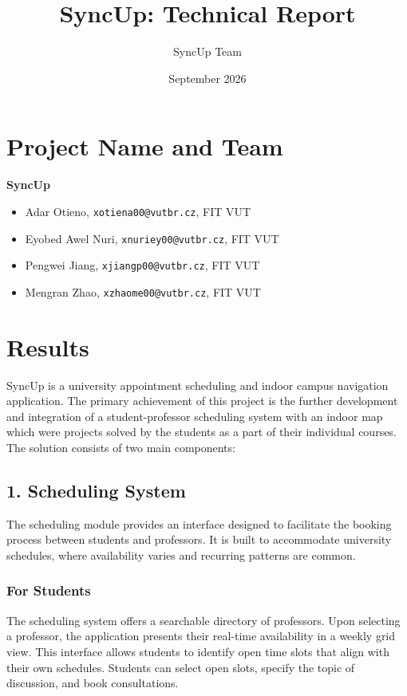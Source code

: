 \documentclass[12pt,a4paper]{article}
\title{\textbf{SyncUp: Technical Report}}
\author{SyncUp Team}
\date{September 2026}
\begin{document}
\maketitle

\section*{Project Name and Team}
\textbf{SyncUp}

\begin{itemize}
    \item Adar Otieno, \texttt{xotiena00@vutbr.cz}, FIT VUT
    \item Eyobed Awel Nuri, \texttt{xnuriey00@vutbr.cz}, FIT VUT
    \item Pengwei Jiang, \texttt{xjiangp00@vutbr.cz}, FIT VUT
    \item Mengran Zhao, \texttt{xzhaome00@vutbr.cz}, FIT VUT
\end{itemize}

\section*{Results}
SyncUp is a university appointment scheduling and indoor campus navigation application. The primary achievement of this project is the further development and integration of a student-professor scheduling system with an indoor map which were projects solved by the students as a part of their individual courses. The solution consists of two main components:

\subsection*{1. Scheduling System}
The scheduling module provides an interface designed to facilitate the booking process between students and professors. It is built to accommodate university schedules, where availability varies and recurring patterns are common.

\subsubsection*{For Students}
The scheduling system offers a searchable directory of professors. Upon selecting a professor, the application presents their real-time availability in a weekly grid view. This interface allows students to identify open time slots that align with their own schedules. Students can select open slots, specify the topic of discussion, and book consultations.
\end{document}
